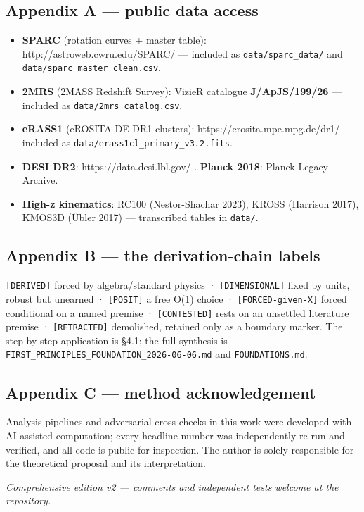 \documentclass[
]{article}
\providecommand{\tightlist}{%
  \setlength{\itemsep}{0pt}\setlength{\parskip}{0pt}}
\begin{document}
\subsection{Appendix A --- public data
access}\label{appendix-a-public-data-access}

\begin{itemize}
\tightlist
\item
  \textbf{SPARC} (rotation curves + master table):
  http://astroweb.cwru.edu/SPARC/ --- included as
  \texttt{data/sparc\_data/} and \texttt{data/sparc\_master\_clean.csv}.
\item
  \textbf{2MRS} (2MASS Redshift Survey): VizieR catalogue
  \textbf{J/ApJS/199/26} --- included as
  \texttt{data/2mrs\_catalog.csv}.
\item
  \textbf{eRASS1} (eROSITA-DE DR1 clusters):
  https://erosita.mpe.mpg.de/dr1/ --- included as
  \texttt{data/erass1cl\_primary\_v3.2.fits}.
\item
  \textbf{DESI DR2}: https://data.desi.lbl.gov/ . \textbf{Planck 2018}:
  Planck Legacy Archive.
\item
  \textbf{High-z kinematics}: RC100 (Nestor-Shachar 2023), KROSS
  (Harrison 2017), KMOS3D (Übler 2017) --- transcribed tables in
  \texttt{data/}.
\end{itemize}

\subsection{Appendix B --- the derivation-chain
labels}\label{appendix-b-the-derivation-chain-labels}

\texttt{{[}DERIVED{]}} forced by algebra/standard physics ·
\texttt{{[}DIMENSIONAL{]}} fixed by units, robust but unearned ·
\texttt{{[}POSIT{]}} a free O(1) choice · \texttt{{[}FORCED-given-X{]}}
forced conditional on a named premise · \texttt{{[}CONTESTED{]}} rests
on an unsettled literature premise · \texttt{{[}RETRACTED{]}}
demolished, retained only as a boundary marker. The step-by-step
application is §4.1; the full synthesis is
\texttt{FIRST\_PRINCIPLES\_FOUNDATION\_2026-06-06.md} and
\texttt{FOUNDATIONS.md}.

\subsection{Appendix C --- method
acknowledgement}\label{appendix-c-method-acknowledgement}

Analysis pipelines and adversarial cross-checks in this work were
developed with AI-assisted computation; every headline number was
independently re-run and verified, and all code is public for
inspection. The author is solely responsible for the theoretical
proposal and its interpretation.

\emph{Comprehensive edition v2 --- comments and independent tests
welcome at the repository.}
\end{document}
